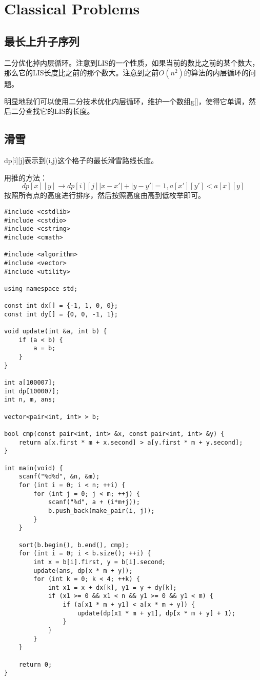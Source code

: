 \documentclass{article}
\begin{document}
\section{Classical Problems}
\subsection{最长上升子序列}
二分优化掉内层循环。注意到LIS的一个性质，如果当前的数比之前的某个数大，那么它的LIS长度比之前的那个数大。注意到之前$O(n^2)$的算法的内层循环的问题。

明显地我们可以使用二分技术优化内层循环，维护一个数组g[]，使得它单调，然后二分查找它的LIS的长度。
\subsection{滑雪}

dp[i][j]表示到(i,j)这个格子的最长滑雪路线长度。

用推的方法：$$dp[x][y]\to dp[i][j]|x-x'|+|y-y'|=1,a[x'][y']<a[x][y]$$
按照所有点的高度进行排序，然后按照高度由高到低枚举即可。
\begin{verbatim}
#include <cstdlib>
#include <cstdio>
#include <cstring>
#include <cmath>

#include <algorithm>
#include <vector>
#include <utility>

using namespace std;

const int dx[] = {-1, 1, 0, 0};
const int dy[] = {0, 0, -1, 1};

void update(int &a, int b) {
    if (a < b) {
        a = b;
    }
}

int a[100007];
int dp[100007];
int n, m, ans;

vector<pair<int, int> > b;

bool cmp(const pair<int, int> &x, const pair<int, int> &y) {
    return a[x.first * m + x.second] > a[y.first * m + y.second];
}

int main(void) {
    scanf("%d%d", &n, &m);
    for (int i = 0; i < n; ++i) {
        for (int j = 0; j < m; ++j) {
            scanf("%d", a + (i*m+j));
            b.push_back(make_pair(i, j));
        }
    }

    sort(b.begin(), b.end(), cmp);
    for (int i = 0; i < b.size(); ++i) {
        int x = b[i].first, y = b[i].second;
        update(ans, dp[x * m + y]);
        for (int k = 0; k < 4; ++k) {
            int x1 = x + dx[k], y1 = y + dy[k];
            if (x1 >= 0 && x1 < n && y1 >= 0 && y1 < m) {
                if (a[x1 * m + y1] < a[x * m + y]) {
                    update(dp[x1 * m + y1], dp[x * m + y] + 1);
                }
            }
        }
    }

    return 0;
}
\end{verbatim}
\end{document}
